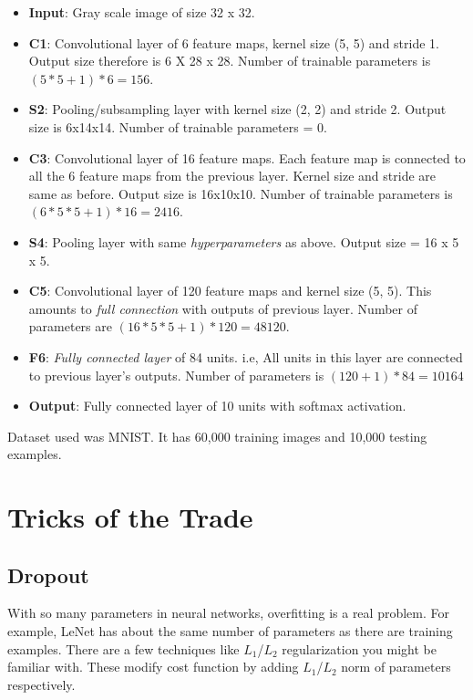 \documentclass[a4paper]{tufte-handout}
\begin{document}
\begin{itemize}
\item
  \textbf{Input}: Gray scale image of size 32 x 32.
\item
  \textbf{C1}: Convolutional layer of 6 feature maps, kernel size (5, 5)
  and stride 1. Output size therefore is 6 X 28 x 28. Number of
  trainable parameters is \((5*5 + 1) * 6 = 156\).
\item
  \textbf{S2}: Pooling/subsampling layer with kernel size (2, 2) and
  stride 2. Output size is 6x14x14. Number of trainable parameters =
  0.
\item
  \textbf{C3}: Convolutional layer of 16 feature maps. Each feature map
  is connected to all the 6 feature maps from the previous layer. Kernel
  size and stride are same as before. Output size is 16x10x10.
  Number of trainable parameters is \((6 * 5 * 5 + 1) * 16 = 2416\).
\item
  \textbf{S4}: Pooling layer with same \emph{hyperparameters} as above.
  Output size = 16 x 5 x 5.
\item
  \textbf{C5}: Convolutional layer of 120 feature maps and kernel size
  (5, 5). This amounts to \emph{full connection} with outputs of
  previous layer. Number of parameters are
  \((16 * 5 * 5 + 1)*120 = 48120\).
\item
  \textbf{F6}: \emph{Fully connected layer} of 84 units. i.e, All units
  in this layer are connected to previous layer's
  outputs. Number of parameters is \((120 + 1)*84 = 10164\)
\item
  \textbf{Output}: Fully connected layer of 10 units with softmax
  activation.
\end{itemize}

Dataset used was MNIST. It has 60,000 training images and 10,000 testing
examples.

\section{Tricks of the Trade}\label{tricks-of-the-trade}

\subsection{Dropout}\label{dropout}

With so many parameters in neural networks, overfitting is a real
problem. For example, LeNet has about the same number of parameters as
there are training examples. There are a few techniques like
\(L_1\)/\(L_2\) regularization you might be familiar with. These modify
cost function by adding \(L_1\)/\(L_2\) norm of parameters respectively.
\end{document}
